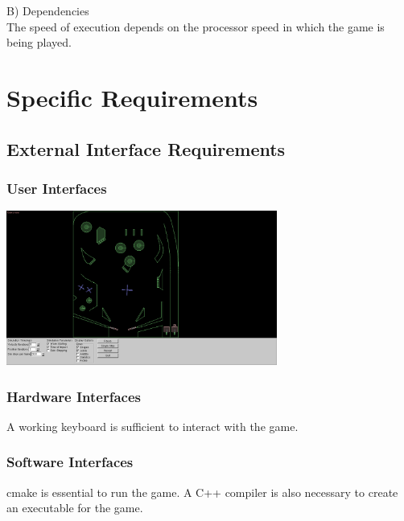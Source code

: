 \documentclass{article}
\begin{document}
    B) Dependencies\\
    
    The speed of execution depends on the processor speed in which the game is being played.

    \section{Specific Requirements}

    \subsection{External Interface Requirements}

    \subsubsection{User Interfaces}

    \begin{minipage}[h]{0.25\textwidth}
        \vspace{0pt}
        \centering
        \includegraphics[width=3.5in,natwidth=610,natheight=642]{userInterface.png}
        \label{fig:Pinball}
    \end{minipage}

    \subsubsection{Hardware Interfaces}
    A working keyboard is sufficient to interact with  the game.

    \subsubsection{Software Interfaces}
    cmake is essential to run the game.
    A C++ compiler is also necessary to create an executable for the game.
\end{document}
